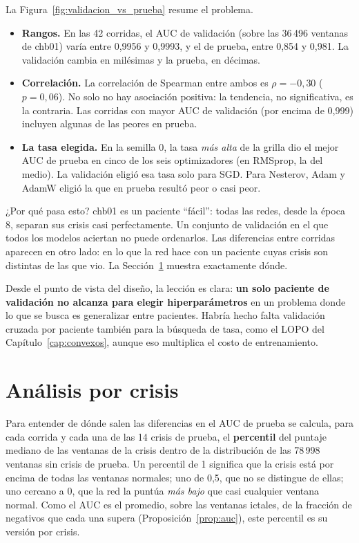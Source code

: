 La Figura~\ref{fig:validacion_vs_prueba} resume el problema.
\begin{itemize}
  \item \textbf{Rangos.} En las 42 corridas, el AUC de validación (sobre las 36\,496 ventanas de chb01) varía entre 0,9956 y
        0,9993, y el de prueba, entre 0,854 y 0,981. La validación cambia en milésimas y la prueba, en décimas.
  \item \textbf{Correlación.} La correlación de Spearman entre ambos es $\rho = -0{,}30$ ($p = 0{,}06$). No solo no hay
        asociación positiva: la tendencia, no significativa, es la contraria. Las corridas con mayor AUC de validación
        (por encima de 0,999) incluyen algunas de las peores en prueba.
  \item \textbf{La tasa elegida.} En la semilla 0, la tasa \emph{más alta} de la grilla dio el mejor AUC de prueba en cinco
        de los seis optimizadores (en RMSprop, la del medio). La validación eligió esa tasa solo para SGD. Para Nesterov,
        Adam y AdamW eligió la que en prueba resultó peor o casi peor.
\end{itemize}

¿Por qué pasa esto? chb01 es un paciente ``fácil'': todas las redes, desde la época 8, separan sus crisis casi
perfectamente. Un conjunto de validación en el que todos los modelos aciertan no puede ordenarlos. Las diferencias entre
corridas aparecen en otro lado: en lo que la red hace con un paciente cuyas crisis son distintas de las que vio. La
Sección~\ref{sec:res_percentil} muestra exactamente dónde.

Desde el punto de vista del diseño, la lección es clara: \textbf{un solo paciente de validación no alcanza para elegir
hiperparámetros} en un problema donde lo que se busca es generalizar entre pacientes. Habría hecho falta validación
cruzada por paciente también para la búsqueda de tasa, como el LOPO del Capítulo~\ref{cap:convexos}, aunque eso
multiplica el costo de entrenamiento.

\section{Análisis por crisis}
\label{sec:res_percentil}

Para entender de dónde salen las diferencias en el AUC de prueba se calcula, para cada corrida y cada una de las 14 crisis
de prueba, el \textbf{percentil} del puntaje mediano de las ventanas de la crisis dentro de la distribución de las 78\,998
ventanas sin crisis de prueba. Un percentil de 1 significa que la crisis está por encima de todas las ventanas normales; uno
de 0,5, que no se distingue de ellas; uno cercano a 0, que la red la puntúa \emph{más bajo} que casi cualquier ventana normal.
Como el AUC es el promedio, sobre las ventanas ictales, de la fracción de negativos que cada una supera
(Proposición~\ref{prop:auc}), este percentil es su versión por crisis.

